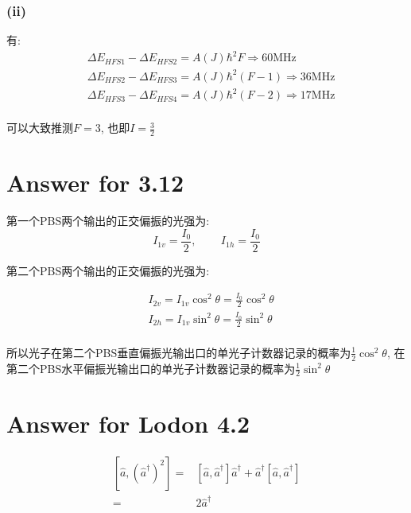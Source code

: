 \documentclass[twoside]{article}
\begin{document}
\subsubsection*{(ii)}

有:
\begin{align*}
     & \Delta E_{HFS1} - \Delta E_{HFS2} = A(J) \hbar^2 F \Rightarrow \text{60MHz}       \\
     & \Delta E_{HFS2} - \Delta E_{HFS3} = A(J) \hbar^2 (F - 1) \Rightarrow \text{36MHz} \\
     & \Delta E_{HFS3} - \Delta E_{HFS4} = A(J) \hbar^2 (F - 2) \Rightarrow \text{17MHz} \\
\end{align*}

可以大致推测$F = 3$, 也即$I = \frac{3}{2}$

\section*{Answer for 3.12}

第一个PBS两个输出的正交偏振的光强为:
$$
    I_{1v} = \frac{I_0}{2} \text{, }\qquad I_{1h} = \frac{I_0}{2}
$$

第二个PBS两个输出的正交偏振的光强为:

\begin{align*}
     & I_{2v} = I_{1v} \cos^2 \theta = \frac{I_0}{2} \cos^2 \theta \\
     & I_{2h} = I_{1v} \sin^2 \theta = \frac{I_0}{2} \sin^2 \theta \\
\end{align*}

所以光子在第二个PBS垂直偏振光输出口的单光子计数器记录的概率为$\frac{1}{2}\cos^2 \theta$, 在第二个PBS水平偏振光输出口的单光子计数器记录的概率为$\frac{1}{2} \sin^2 \theta$

\section*{Answer for Lodon 4.2}

\begin{equation*}
    \begin{split}
        \left[\hat{a}, \left(\hat{a}^{\dagger}\right)^2\right] = & \left[\hat{a}, \hat{a}^\dagger\right] \hat{a}^\dagger + \hat{a}^\dagger \left[\hat{a}, \hat{a}^\dagger\right] \\
        =                                                        & 2 \hat{a}^\dagger                                                                                             \\
    \end{split}
\end{equation*}
\end{document}
